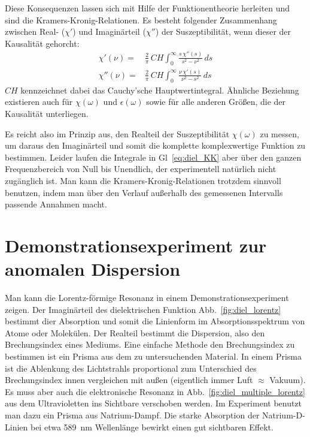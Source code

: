 Diese Konsequenzen lassen sich mit Hilfe der Funktionentheorie herleiten und sind die Kramers-Kronig-Relationen. Es besteht folgender Zusammenhang zwischen Real- ($\chi'$) und Imaginärteil  ($\chi''$) der Suszeptibilität, wenn dieser der Kausalität gehorcht:
\begin{align}
 \chi'(\nu) = & \frac{2}{\pi} \, CH \int_0^\infty \frac{s  \, \chi''(s)}{s^2 - \nu^2} \, ds \\
 \chi''(\nu) = & \frac{2}{\pi}\,  CH \int_0^\infty \frac{\nu \, \chi'(s)}{\nu^2 - s^2} \, ds 
 \label{eq:diel_KK}
\end{align}
$CH$ kennzeichnet dabei das Cauchy'sche Hauptwertintegral. Ähnliche Beziehung existieren auch für $\chi(\omega)$ und $\epsilon(\omega)$ sowie für alle anderen Größen, die der Kausalität unterliegen.

Es reicht also im Prinzip aus, den Realteil der Suszeptibilität $\chi(\omega)$ zu messen, um daraus den Imaginärteil und somit die komplette komplexwertige Funktion zu bestimmen. Leider laufen die Integrale in Gl~\ref{eq:diel_KK} aber über den ganzen Frequenzbereich von Null bis Unendlich, der experimentell natürlich nicht zugänglich ist. Man kann die Kramers-Kronig-Relationen trotzdem sinnvoll benutzen, indem man über den Verlauf außerhalb des gemessenen Intervalls passende Annahmen macht.


\section{Demonstrationsexperiment zur anomalen Dispersion}

Man kann die Lorentz-förmige Resonanz in einem Demonstrationsexperiment zeigen. Der Imaginärteil des dielektrischen Funktion Abb.~\ref{fig:diel_lorentz} bestimmt dier Absorption und somit die Linienform im Absorptionsspektrum von Atome oder Molekülen. Der Realteil bestimmt die Dispersion, also den Brechungsindex eines Mediums. Eine einfache Methode den Brechungsindex zu bestimmen ist ein Prisma aus dem zu untersuchenden Material. In einem Prisma ist die Ablenkung des Lichtstrahls proportional zum Unterschied des Brechungsindex innen vergleichen mit außen (eigentlich immer Luft $\approx$ Vakuum). Es muss aber auch die elektronische Resonanz in Abb.~\ref{fig:diel_multiple_lorentz} aus dem Ultravioletten ins Sichtbare verschoben werden. Im Experiment benutzt man dazu ein Prisma aus Natrium-Dampf. Die starke Absorption der Natrium-D-Linien bei etwa 589~nm Wellenlänge bewirkt einen gut sichtbaren Effekt. 


